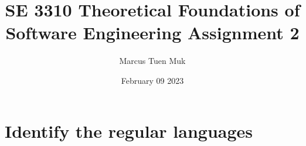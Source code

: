 \documentclass[12pt]{article}
\title{SE 3310 Theoretical Foundations of Software Engineering Assignment 2}
\author{Marcus Tuen Muk}
\date{February 09 2023}
\begin{document}
    \begin{titlepage}
        \clearpage\maketitle
        \thispagestyle{empty}
    \end{titlepage}

    \section{Identify the regular languages}
        
                
\end{document}

